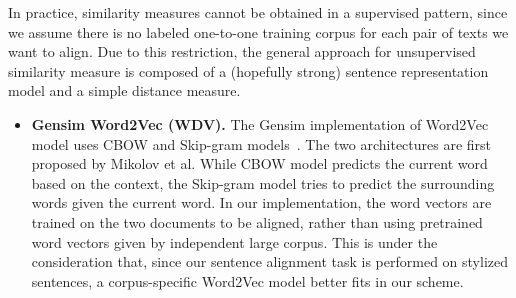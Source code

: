 \documentclass[runningheads]{llncs}
\begin{document}
In practice, similarity measures cannot be obtained in a supervised pattern, since we assume there is no labeled one-to-one training corpus for each pair of texts we want to align. Due to this restriction, the general approach for unsupervised similarity measure is composed of a (hopefully strong) sentence representation model and a simple distance measure.
\begin{itemize}
	\item \textbf{Gensim Word2Vec (WDV).} The Gensim implementation of Word2Vec model uses CBOW and Skip-gram models~\cite{mikolov2013distributed}. The two architectures are first proposed by Mikolov et al. While CBOW model predicts the current word based on the context, the Skip-gram model tries to predict the surrounding words given the current word. In our implementation, the word vectors are trained on the two documents to be aligned, rather than using pretrained word vectors given by independent large corpus. This is under the consideration that, since our sentence alignment task is performed on stylized sentences, a corpus-specific Word2Vec model better fits in our scheme. 
	

\end{itemize}
\end{document}
